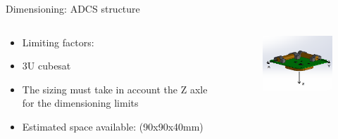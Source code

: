 \documentclass{beamer}
\begin{document}
\begin{frame}{Dimensioning: ADCS structure}
    
     \begin{columns}[t]
        \begin{column}[t]{0.5\textwidth}
            \begin{itemize}
                \item Limiting factors:
                     \item 3U cubesat
                \item The sizing must take in account the Z axle for the dimensioning limits
                     \item Estimated space available: (90x90x40mm)

            \end{itemize}
        \end{column}
        \begin{column}[t]{0.5\textwidth}
            \begin{figure}[!ht]
                \begin{center}
                    \includegraphics[width=5cm]{figures/Image axles.png}
                \end{center}
            \end{figure}
        \end{column}
    \end{columns}

\end{frame}
\end{document}
